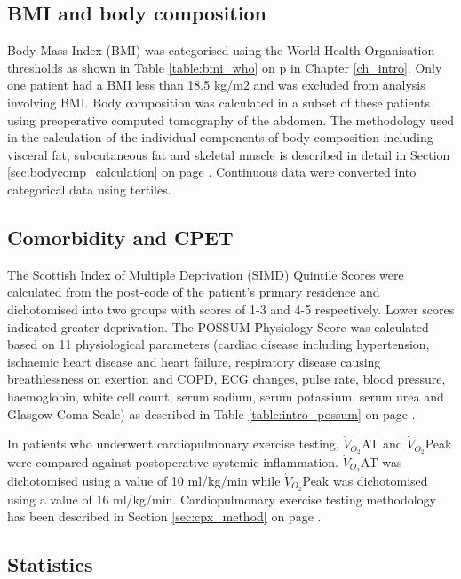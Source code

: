 \subsection{BMI and body composition}
Body Mass Index (BMI) was categorised using the World Health Organisation thresholds as shown in Table \ref{table:bmi_who} on p \pageref{table:bmi_who} in Chapter \ref{ch_intro}. 
Only one patient had a BMI less than 18.5 kg/m$2$ and was excluded from analysis involving BMI.
Body composition was calculated in a subset of these patients using preoperative computed tomography of the abdomen. 
The methodology used in the calculation of the individual components of body composition including visceral fat, subcutaneous fat and skeletal muscle is described in detail in Section \ref{sec:bodycomp_calculation} on page \pageref{sec:bodycomp_calculation}. 
Continuous data were converted into categorical data using tertiles.

\subsection{Comorbidity and CPET}
The Scottish Index of Multiple Deprivation (SIMD) Quintile Scores were calculated from the post-code of the patient's primary residence and dichotomised into two groups with scores of 1-3 and 4-5 respectively.
Lower scores indicated greater deprivation.
The POSSUM Physiology Score was calculated based on 11 physiological parameters (cardiac disease including hypertension, ischaemic heart disease and heart failure, respiratory disease causing breathlessness on exertion and COPD, ECG changes, pulse rate, blood pressure, haemoglobin, white cell count, serum sodium, serum potassium, serum urea and Glasgow Coma Scale) as described in Table \ref{table:intro_possum} on page \pageref{table:intro_possum}.

In patients who underwent cardiopulmonary exercise testing, $\dot{V}_{O_2}$AT and $\dot{V}_{O_2}$Peak were compared against postoperative systemic inflammation. 
$\dot{V}_{O_2}$AT was dichotomised using a value of 10 ml/kg/min while $\dot{V}_{O_2}$Peak was dichotomised using a value of 16 ml/kg/min. 
Cardiopulmonary exercise testing methodology has been described in Section \ref{sec:cpx_method} on page \pageref{sec:cpx_method}.


\subsection{Statistics}


